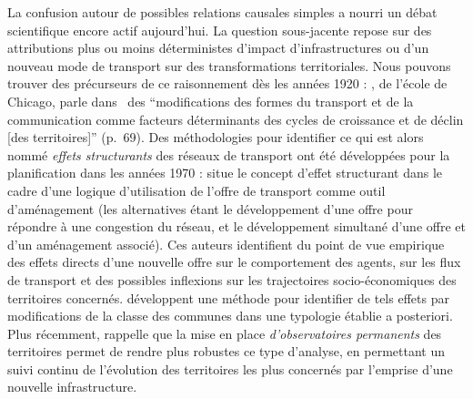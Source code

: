 {La confusion autour de possibles relations causales simples a nourri un débat scientifique encore actif aujourd'hui. La question sous-jacente repose sur des attributions plus ou moins déterministes d'impact d'infrastructures ou d'un nouveau mode de transport sur des transformations territoriales. Nous pouvons trouver des précurseurs de ce raisonnement dès les années 1920 : , de l'école de Chicago, parle dans~\cite{burgess1925city} des ``modifications des formes du transport et de la communication comme facteurs déterminants des cycles de croissance et de déclin [des territoires]'' (p.~69). Des méthodologies pour identifier ce qui est alors nommé \emph{effets structurants} des réseaux de transport ont été développées pour la planification dans les années 1970 : \cite{bonnafous1974methodologies} situe le concept d'effet structurant dans le cadre d'une logique d'utilisation de l'offre de transport comme outil d'aménagement (les alternatives étant le développement d'une offre pour répondre à une congestion du réseau, et le développement simultané d'une offre et d'un aménagement associé). Ces auteurs identifient du point de vue empirique des effets directs d'une nouvelle offre sur le comportement des agents, sur les flux de transport et des possibles inflexions sur les trajectoires socio-économiques des territoires concernés. \cite{bonnafous1974detection} développent une méthode pour identifier de tels effets par modifications de la classe des communes dans une typologie établie a posteriori. Plus récemment, \cite{bonnafous2014observatoires} rappelle que la mise en place \emph{d'observatoires permanents} des territoires permet de rendre plus robustes ce type d'analyse, en permettant un suivi continu de l'évolution des territoires les plus concernés par l'emprise d'une nouvelle infrastructure.
}


